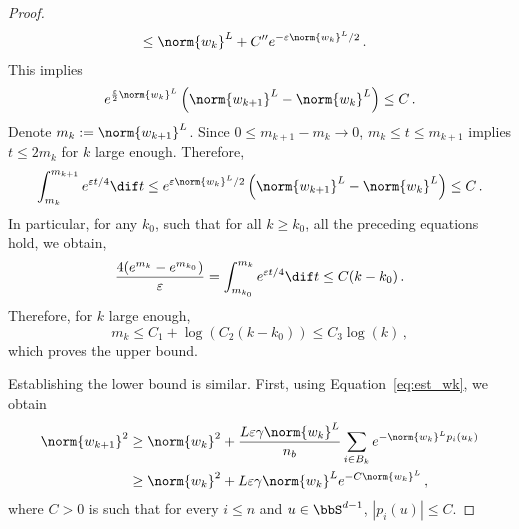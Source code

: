 \begin{proof}
\begin{equation*}
\begin{split}
    &\leq \norm{w_k}^L + C'' e^{-\varepsilon\norm{w_k}^L /2}\, . 
  \end{split}
  \end{equation*}
 This implies
  \begin{equation*}
    e^{\frac{\varepsilon}{2} \norm{w_k}^L}\left(\norm{w_{k+1}}^L  - \norm{w_k}^L\right)\leq C \, .
  \end{equation*}
  Denote $m_k:=\norm{w_{k+1}}^L$. Since $0 \leq m_{k+1} - m_k \rightarrow 0$, $ m_k \leq t \leq m_{k+1}$ implies $t \leq 2m_k$ for $k$ large enough. Therefore,
  \begin{equation*}
    \int_{m_k}^{m_{k+1}} e^{\varepsilon t/4}\dif t \leq   e^{\varepsilon \norm{w_k}^L/2}\left(\norm{w_{k+1}}^L  - \norm{w_k}^L\right)  \leq C \, .
  \end{equation*}
  In particular, for any $k_0$, such that for all $k \geq k_0$, all the preceding equations hold, we obtain,
  \begin{equation*}
    \frac{4(e^{m_k} -e^{m_{k_0}}) }{\varepsilon} = \int_{m_{k_0}}^{m_{k}} e^{\varepsilon t/4}\dif t  \leq C(k-k_0)\, .
  \end{equation*}
  Therefore, for $k$ large enough,
  \begin{equation*}
    m_{k}\leq C_1 + \log(C_2(k-k_0)) \leq C_3 \log(k)\, ,
  \end{equation*}
  which proves the upper bound.

Establishing the lower bound is similar. First, using Equation~\eqref{eq:est_wk}, we obtain
  \begin{equation*}
    \begin{split}
      \norm{w_{k+1}}^2 &\geq \norm{w_k}^2 + \frac{L \varepsilon\gamma \norm{w_k}^L}{n_b}\sum_{i\in B_k}e^{-\norm{w_k}^Lp_i(u_k)}\\
  &\geq \norm{w_k}^2 + L \varepsilon \gamma  \norm{w_k}^L e^{-C\norm{w_k}^L}\, ,
    \end{split}
  \end{equation*}
  where $C>0$ is such that for every $i \leq n$ and $u \in \bbS^{d-1}$, $|p_i(u)| \leq C$.



\end{proof}
